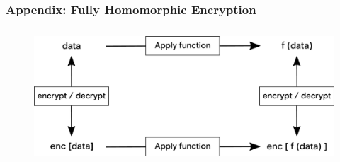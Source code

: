 \documentclass[xetex,mathsans,sans,aspectratio=169]{beamer}
\begin{document}
    \begin{frame}
      \frametitle{Appendix: Fully Homomorphic Encryption}
      \begin{figure}
        \centering
        \includegraphics[height=5cm]{pdf/fhe.pdf}
      \end{figure}
    \end{frame}
\end{document}
